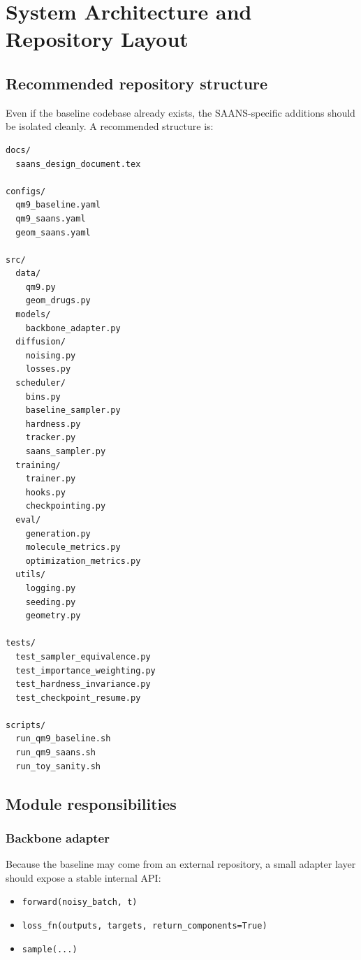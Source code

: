 \documentclass[11pt]{report}
\begin{document}
\chapter{System Architecture and Repository Layout}

\section{Recommended repository structure}

Even if the baseline codebase already exists, the SAANS-specific additions should be isolated cleanly. A recommended structure is:

\begin{lstlisting}[style=codeblock]
docs/
  saans_design_document.tex

configs/
  qm9_baseline.yaml
  qm9_saans.yaml
  geom_saans.yaml

src/
  data/
    qm9.py
    geom_drugs.py
  models/
    backbone_adapter.py
  diffusion/
    noising.py
    losses.py
  scheduler/
    bins.py
    baseline_sampler.py
    hardness.py
    tracker.py
    saans_sampler.py
  training/
    trainer.py
    hooks.py
    checkpointing.py
  eval/
    generation.py
    molecule_metrics.py
    optimization_metrics.py
  utils/
    logging.py
    seeding.py
    geometry.py

tests/
  test_sampler_equivalence.py
  test_importance_weighting.py
  test_hardness_invariance.py
  test_checkpoint_resume.py

scripts/
  run_qm9_baseline.sh
  run_qm9_saans.sh
  run_toy_sanity.sh
\end{lstlisting}

\section{Module responsibilities}

\subsection{Backbone adapter}

Because the baseline may come from an external repository, a small adapter layer should expose a stable internal API:

\begin{itemize}[leftmargin=2em]
    \item \texttt{forward(noisy\_batch, t)}
    \item \texttt{loss\_fn(outputs, targets, return\_components=True)}
    \item \texttt{sample(...)}
\end{itemize}
\end{document}
